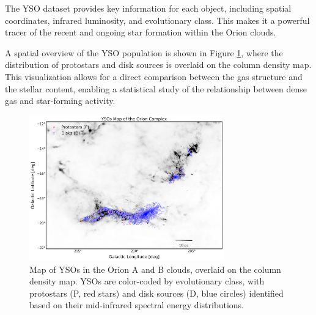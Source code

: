The YSO dataset provides key information for each object, including spatial coordinates, infrared luminosity, and evolutionary class. This makes it a powerful tracer of the recent and ongoing star formation within the Orion clouds.

A spatial overview of the YSO population is shown in Figure \ref{fig:YSO_map}, where the distribution of protostars and disk sources is overlaid on the column density map. This visualization allows for a direct comparison between the gas structure and the stellar content, enabling a statistical study of the relationship between dense gas and star-forming activity.

\begin{figure}[t]
    \centering
    \includegraphics[width=0.75\textwidth]{figures/YSOs_orion.png}
    \caption{Map of YSOs in the Orion A and B clouds, overlaid on the column density map. YSOs are color-coded by evolutionary class, with protostars (P, red stars) and disk sources (D, blue circles) identified based on their mid-infrared spectral energy distributions.}
    \label{fig:YSO_map}
\end{figure}